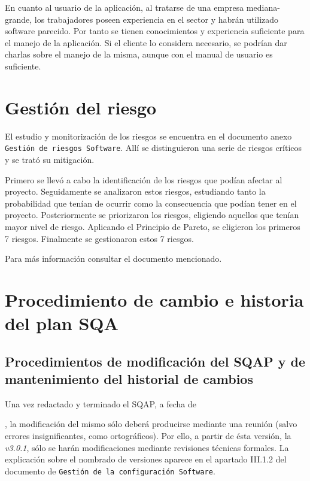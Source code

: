 \documentclass[spanish,a4paper,11pt, twoside]{report}	%
\begin{document}
	En cuanto al usuario de la aplicación, al tratarse de una empresa mediana- grande, los trabajadores poseen experiencia en el sector y habrán utilizado software parecido. Por tanto se tienen conocimientos y experiencia suficiente para el manejo de la aplicación. Si el cliente lo considera necesario, se podrían dar charlas sobre el manejo de la misma, aunque con el manual de usuario es suficiente.

\newpage
\mbox{}
\thispagestyle{empty}						%
\newpage

\chapter{ \hspace{0.25cm}Gestión del riesgo}
	El estudio y monitorización de los riesgos se encuentra en el documento anexo \texttt{Gestión de riesgos Software}. Allí se distinguieron una serie de riesgos críticos y se trató su mitigación. 

	Primero se llevó a cabo la identificación de los riesgos que podían afectar al proyecto. Seguidamente se analizaron estos riesgos, estudiando tanto la probabilidad que tenían de ocurrir como la consecuencia que podían tener en el proyecto. Posteriormente se priorizaron los riesgos, eligiendo aquellos que tenían mayor nivel de riesgo. Aplicando el Principio de Pareto, se eligieron los primeros 7 riesgos. Finalmente se gestionaron estos 7 riesgos.

	Para más información consultar el documento mencionado.


\newpage
\mbox{}
\thispagestyle{empty}						%
\newpage

\chapter{ Procedimiento de cambio e historia del plan SQA}
	\section{Procedimientos de modificación del SQAP y de mantenimiento del historial de cambios}
	
	Una vez redactado y terminado el SQAP, a fecha de \date{\Today}, la modificación del mismo sólo deberá producirse mediante una reunión (salvo errores insignificantes, como ortográficos). Por ello, a partir de ésta versión, la \textit{v3.0.1}, sólo se harán modificaciones mediante revisiones técnicas formales. La explicación sobre el nombrado de versiones aparece en el apartado III.1.2 del documento de \texttt{Gestión de la configuración Software}.
\end{document}
